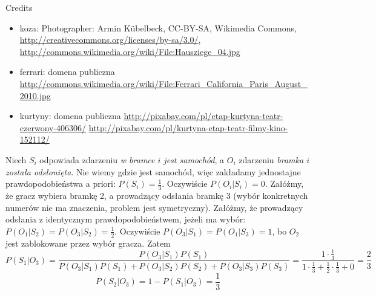 \documentclass{mp}
\begin{document}
\begin{frame}{Credits}
\begin{itemize}
\item koza: Photographer: Armin Kübelbeck, CC-BY-SA, Wikimedia Commons, \url{http://creativecommons.org/licenses/by-sa/3.0/}, \url{http://commons.wikimedia.org/wiki/File:Hausziege_04.jpg}
\item ferrari: domena publiczna \url{http://commons.wikimedia.org/wiki/File:Ferrari_California_Paris_August_2010.jpg}
\item kurtyny: domena publiczna \url{http://pixabay.com/pl/etap-kurtyna-teatr-czerwony-406306/} \url{http://pixabay.com/pl/kurtyna-etap-teatr-filmy-kino-152112/}
\end{itemize}
{
	Niech $S_i$ odpowiada zdarzeniu \emph{w bramce $i$ jest samochód}, a $O_i$ zdarzeniu \emph{bramka $i$ została odsłonięta}.
	Nie wiemy gdzie jest samochód, więc zakładamy jednostajne prawdopodobieństwa a priori: $P(S_i)=\frac{1}{3}$.
	Oczywiście $P(O_i|S_i)=0$.
	Załóżmy, że gracz wybiera bramkę 2, a prowadzący odsłania bramkę 3 (wybór konkretnych numerów nie ma znaczenia, problem jest symetryczny).
	Załóżmy, że prowadzący odsłania z identycznym prawdopodobieństwem, jeżeli ma wybór: $P(O_1|S_2)=P(O_3|S_2)=\frac{1}{2}$.
	Oczywiście $P(O_3|S_1)=P(O_1|S_3)=1$, bo $O_2$ jest zablokowane przez wybór gracza.
	Zatem
	\[ P(S_1|O_3)=\frac{P(O_3|S_1)P(S_1)}{P(O_3|S_1)P(S_1)+P(O_3|S_2)P(S_2)+P(O_3|S_3)P(S_3)} = \frac{1\cdot \frac{1}{3}}{1\cdot \frac{1}{3} + \frac{1}{2}\cdot \frac{1}{3} + 0} = \frac{2}{3} \]
	\[
	P(S_2|O_3)=1 - P(S_1|O_3) = \frac{1}{3}
	\]
}
\end{frame}
\end{document}
